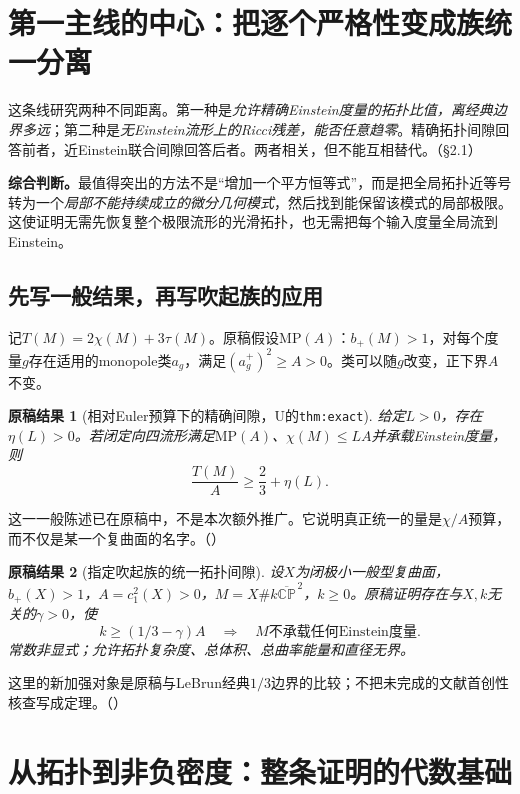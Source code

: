 \documentclass[UTF8,fontset=fandol,zihao=-4]{ctexart}
\theoremstyle{research}
\newtheorem{result}{原稿结果}[section]
\newcommand{\CP}{\mathbb{CP}}
\numberwithin{equation}{section}
\begin{document}
\section{第一主线的中心：把逐个严格性变成族统一分离}
这条线研究两种不同距离。第一种是\emph{允许精确Einstein度量的拓扑比值，离经典边界多远}；第二种是\emph{无Einstein流形上的Ricci残差，能否任意趋零}。精确拓扑间隙回答前者，近Einstein联合间隙回答后者。两者相关，但不能互相替代。\cite{Overview}（§2.1）

\textbf{综合判断。}最值得突出的方法不是“增加一个平方恒等式”，而是把全局拓扑近等号转为一个\emph{局部不能持续成立的微分几何模式}，然后找到能保留该模式的局部极限。这使证明无需先恢复整个极限流形的光滑拓扑，也无需把每个输入度量全局流到Einstein。

\subsection{先写一般结果，再写吹起族的应用}
记$T(M)=2\chi(M)+3\tau(M)$。原稿假设$\mathrm{MP}(A)$：$b_+(M)>1$，对每个度量$g$存在适用的monopole类$a_g$，满足$(a_g^+)^2\ge A>0$。类可以随$g$改变，正下界$A$不变。
\begin{result}[相对Euler预算下的精确间隙，U的\texttt{thm:exact}]
给定$L>0$，存在$\eta(L)>0$。若闭定向四流形满足$\mathrm{MP}(A)$、$\chi(M)\le LA$并承载Einstein度量，则
\[
\frac{T(M)}A\ge\frac23+\eta(L).
\]
\end{result}
这一一般陈述已在原稿中，不是本次额外推广。它说明真正统一的量是$\chi/A$预算，而不仅是某一个复曲面的名字。\cite{U}（）

\begin{result}[指定吹起族的统一拓扑间隙]
设$X$为闭极小一般型复曲面，$b_+(X)>1$，$A=c_1^2(X)>0$，$M=X\#k\overline{\CP}^{\,2}$，$k\ge0$。原稿证明存在与$X,k$无关的$\gamma>0$，使
\[
k\ge(1/3-\gamma)A\quad\Longrightarrow\quad M\text{不承载任何Einstein度量}.
\]
常数非显式；允许拓扑复杂度、总体积、总曲率能量和直径无界。
\end{result}
这里的新加强对象是原稿与LeBrun经典$1/3$边界的比较；不把未完成的文献首创性核查写成定理。\cite{U}（）

\section{从拓扑到非负密度：整条证明的代数基础}
\end{document}
